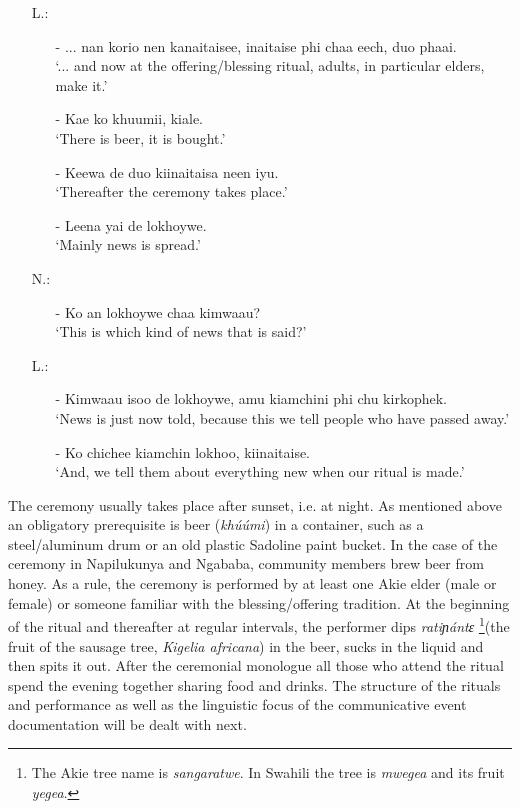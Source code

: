 \documentclass[output=paper,colorlinks,citecolor=brown]{langscibook}
\begin{document}
\begin{enumerate}
    \item[L.:]
    \begin{enumerate}
        \item[-]    ... nan korio nen kanaitaisee, inaitaise phi chaa eech, duo phaai.\\
                    `... and now at the offering/blessing ritual, adults, in particular elders, make it.'
        \item[-]    Kae ko khuumii, kiale.\\
                    `There is beer, it is bought.'
        \item[-]    Keewa de duo kiinaitaisa neen iyu.\\
                    `Thereafter the ceremony takes place.'
        \item[-]    Leena yai de lokhoywe.\\
                    `Mainly news is spread.'
    \end{enumerate}
    \item[N.:]
    \begin{enumerate}
        \item[-]    Ko an lokhoywe chaa kimwaau?\\
                    `This is which kind of news that is said?' 
    \end{enumerate}
    \item[L.:]
    \begin{enumerate}
        \item[-]    Kimwaau isoo de lokhoywe, amu kiamchini phi chu kirkophek. \\
                    `News is just now told, because this we tell people who have passed away.'
        \item[-]    Ko chichee kiamchin lokhoo, kiinaitaise. \\
                    `And, we tell them about everything new when our ritual is made.'
    \end{enumerate}
\end{enumerate}

The ceremony usually takes place after sunset, i.e. at night. As mentioned above an obligatory prerequisite is beer (\textit{khúúmi}) in a container, such as a steel\slash aluminum drum or an old plastic Sadoline paint bucket. In the case of the ceremony in Napilukunya and Ngababa, community members brew beer from honey. As a rule, the ceremony is performed by at least one Akie elder (male or female) or someone familiar with the blessing/offering tradition. At the beginning of the ritual and thereafter at regular intervals, the performer dips \textit{ratiɲántɛ }\footnote{The Akie tree name is \textit{sangaratwe}. In Swahili the tree is \textit{mwegea} and its fruit \textit{yegea}.}(the fruit of the sausage tree, \textit{Kigelia africana}) in the beer, sucks in the liquid and then spits it out. After the ceremonial monologue all those who attend the ritual spend the evening together sharing food and drinks. The structure of the rituals and performance as well as the linguistic focus of the communicative event documentation  will be dealt with next.
\end{document}
